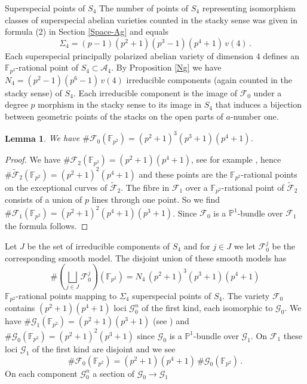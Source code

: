 \documentclass[11pt]{amsart}
\numberwithin{equation}{section}
\newcommand{\FF}{\mathbb F}
\newcommand{\PP}{\mathbb P}
\newtheorem{lemma}[theorem]{Lemma}
\theoremstyle{definition}
\theoremstyle{remark}
\begin{document}
\begin{section}{Superspecial points of $S_4$}
The number of points of $S_4$ representing isomorphism classes of superspecial
abelian varieties counted in the stacky sense was given 
in formula (2) in Section \ref{Space-Ag}  and equals
$$
\Sigma_4= (p-1)(p^2+1)(p^3-1)(p^4+1) \, v(4)\, .
$$
Each superspecial principally polarized abelian variety of dimension $4$ defines an
${\FF}_{p^2}$-rational point of $S_4\subset \mathcal{A}_4$. By Proposition
\ref{Ng} we have $N_4=(p^2-1)(p^6-1)\, v(4)$
irreducible components (again counted in the stacky sense) of $S_4$. Each irreducible component
is the image of $\mathcal{F}_0$ under a degree $p$ morphism in the stacky sense to its image in $S_4$ 
that induces a bijection between geometric points of the stacks on the open parts of $a$-number one.
\begin{lemma}
We have $ \# \mathcal{F}_0({\FF}_{p^2})=(p^2+1)^3(p^3+1)(p^4+1)$.
\end{lemma}
\begin{proof}
We have $\# \mathcal{F}_2({\FF}_{p^2})=(p^2+1)(p^4+1)$, see for example \cite{K2017}, hence
$\# \tilde{\mathcal{F}}_2({\FF}_{p^2})=(p^2+1)^2(p^4+1)$ and these points are the
${\FF}_{p^2}$-rational points on the exceptional curves of $\tilde{\mathcal{F}}_2$.
The fibre in $\mathcal{F}_1$ over a ${\FF}_{p^2}$-rational point of $\tilde{\mathcal{F}}_2$
consists of a union of $p$ lines through one point. So we find
$\# \mathcal{F}_1({\FF}_{p^2})=(p^2+1)^2(p^4+1)(p^3+1)$. Since $\mathcal{F}_0$ is a ${\PP}^1$-bundle
over $\mathcal{F}_1$ the formula follows.
\end{proof}
Let $J$ be the set of irreducible components of $S_4$ and for $j\in J$ we let $\mathcal{F}_0^j$
be the corresponding smooth model. The disjoint union of these smooth models has
$$
\# (\bigsqcup_{j\in J} \mathcal{F}_0^j)({\FF}_{p^2})= N_4 \, (p^2+1)^3(p^3+1)(p^4+1) 
$$
${\FF}_{p^2}$-rational points mapping to $\Sigma_4$ superspecial points of $S_4$.
The variety $\mathcal{F}_0$ contains $(p^2+1)(p^4+1)$ loci $\mathcal{G}_0^n$ of the
first kind, each isomorphic to $\mathcal{G}_0$. We have
$\# \mathcal{G}_1({\FF}_{p^2})=(p^2+1)(p^3+1)$ (see \cite{K2017})
and $\# \mathcal{G}_0({\FF}_{p^2})=(p^2+1)^2(p^3+1)$ since $\mathcal{G}_0$
is a ${\PP}^1$-bundle over $\mathcal{G}_1$.
On $\mathcal{F}_1$ these loci $\mathcal{G}_1$ of the first kind are disjoint and we
see
$$
\# \mathcal{F}_0({\FF}_{p^2})=(p^2+1)(p^4+1)\,  \# \mathcal{G}_0({\FF}_{p^2})\, .
$$
On each component $\mathcal{G}_0^n$ a section of $\mathcal{G}_0 \to \mathcal{G}_1$

\end{section}
\end{document}
